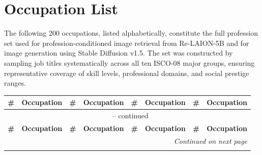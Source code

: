 \chapter{Occupation List}
\label{app:occupation_list}

The following 200 occupations, listed alphabetically, constitute the full profession set used for profession-conditioned image retrieval from Re-LAION-5B and for image generation using Stable Diffusion v1.5. The set was constructed by sampling job titles systematically across all ten ISCO-08 major groups, ensuring representative coverage of skill levels, professional domains, and social prestige ranges.


{\small
\setlength{\tabcolsep}{3pt}
\renewcommand{\arraystretch}{0.95}

\begin{longtable}{r p{2.5cm} r p{2.5cm} r p{2.5cm} r p{2.5cm}}
\toprule
\textbf{\#} & \textbf{Occupation} & \textbf{\#} & \textbf{Occupation} & \textbf{\#} & \textbf{Occupation} & \textbf{\#} & \textbf{Occupation} \\
\midrule
\endfirsthead

\multicolumn{8}{c}{\tablename\ \thetable{} -- continued} \\
\toprule
\textbf{\#} & \textbf{Occupation} & \textbf{\#} & \textbf{Occupation} & \textbf{\#} & \textbf{Occupation} & \textbf{\#} & \textbf{Occupation} \\
\midrule
\endhead

\midrule
\multicolumn{8}{r}{\textit{Continued on next page}} \\
\endfoot

\bottomrule
\endlastfoot


\end{longtable}}
